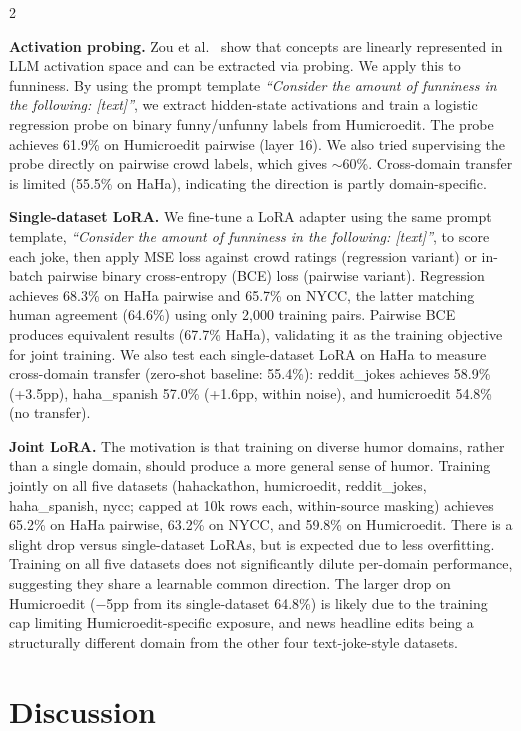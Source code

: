 \documentclass[10pt, a4paper]{article}
\begin{document}
\begin{multicols}{2}

\textbf{Activation probing.} Zou et al.\ \cite{zou2023} show that concepts are linearly represented in LLM activation space and can be extracted via probing. We apply this to funniness. By using the prompt template \textit{``Consider the amount of funniness in the following: [text]''}, we extract hidden-state activations and train a logistic regression probe on binary funny/unfunny labels from Humicroedit. The probe achieves 61.9\% on Humicroedit pairwise (layer 16). We also tried supervising the probe directly on pairwise crowd labels, which gives $\sim$60\%. Cross-domain transfer is limited (55.5\% on HaHa), indicating the direction is partly domain-specific.

\textbf{Single-dataset LoRA.} We fine-tune a LoRA adapter \cite{hu2021} using the same prompt template, \textit{``Consider the amount of funniness in the following: [text]''}, to score each joke, then apply MSE loss against crowd ratings (regression variant) or in-batch pairwise binary cross-entropy (BCE) loss (pairwise variant). Regression achieves 68.3\% on HaHa pairwise and 65.7\% on NYCC, the latter matching human agreement (64.6\%) using only 2,000 training pairs. Pairwise BCE produces equivalent results (67.7\% HaHa), validating it as the training objective for joint training. We also test each single-dataset LoRA on HaHa to measure cross-domain transfer (zero-shot baseline: 55.4\%): reddit\_jokes achieves 58.9\% (+3.5pp), haha\_spanish 57.0\% (+1.6pp, within noise), and humicroedit 54.8\% (no transfer).

\textbf{Joint LoRA.} The motivation is that training on diverse humor domains, rather than a single domain, should produce a more general sense of humor. Training jointly on all five datasets (hahackathon, humicroedit, reddit\_jokes, haha\_spanish, nycc; capped at 10k rows each, within-source masking) achieves 65.2\% on HaHa pairwise, 63.2\% on NYCC, and 59.8\% on Humicroedit. There is a slight drop versus single-dataset LoRAs, but is expected due to less overfitting. Training on all five datasets does not significantly dilute per-domain performance, suggesting they share a learnable common direction. The larger drop on Humicroedit ($-$5pp from its single-dataset 64.8\%) is likely due to the training cap limiting Humicroedit-specific exposure, and news headline edits being a structurally different domain from the other four text-joke-style datasets.

\section{Discussion}


\end{multicols}
\end{document}
